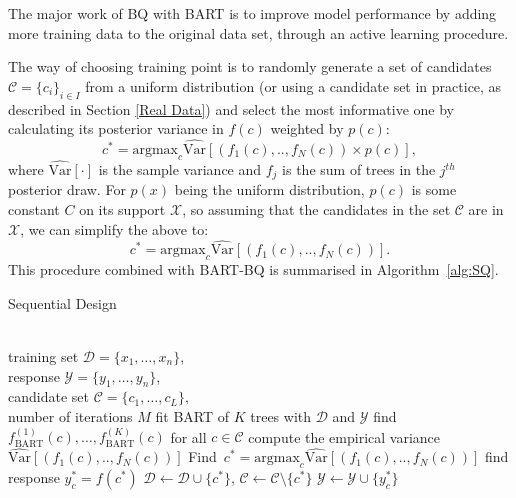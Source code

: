 The major work of BQ with BART is to improve model performance by adding more training data to the original data set, through an active learning procedure.

The way of choosing training point is to randomly generate a set of candidates $ \mathcal{C} = \{ c_i\}_{i\in I}$ from a uniform distribution (or using a candidate set in practice, as described in Section \ref{Real Data}) and select the most informative one by calculating its posterior variance in $f(c)$ weighted by $p(c)$:
\begin{equation}
	c^* = \mbox{argmax}_c \widehat{\mbox{Var}}[(f_{1}(c),..,f_{N}(c))\times p(c)],
	\label{eq:maxvariance}
\end{equation}
where $\widehat{\mbox{Var}}[\cdot]$ is the sample variance and $f_j$ is the sum of trees in the $j^{th}$ posterior draw. For $p(x)$ being the uniform distribution, $p(c)$ is some constant $C$ on its support $\mathcal{X}$, so assuming that the candidates in the set $\mathcal{C}$ are in $\mathcal{X}$, we can simplify the above to:
\begin{equation}
	c^* = \mbox{argmax}_c \widehat{\mbox{Var}}[(f_{1}(c),..,f_{N}(c))].
	\label{eq:maxvar}
\end{equation}
This procedure combined with BART-BQ is summarised in Algorithm~\ref{alg:SQ}.

\begin{algorithm}[tbh!]
  \caption{Sequential Design}
  \label{alg:SQ}
\begin{algorithmic}
  \\training set $\mathcal{D} = \{x_1, \ldots, x_n\}$, \\response $\mathcal{Y} = \{y_1, \ldots, y_n\}$, \\candidate set $\mathcal{C} = \{c_1, \ldots, c_L\},$ 
  \\
  number of iterations $M$
  \STATE fit BART of $K$ trees with $\mathcal{D}$ and $\mathcal{Y}$
  \STATE find $f_{\mbox{BART}}^{(1)}(c), \ldots, f_{\mbox{BART}}^{(K)}(c)$ for all $c\in\mathcal{C}$
  \STATE compute the empirical variance $ \widehat{\mbox{Var}}[(f_{1}(c),..,f_{N}(c))]$
  \STATE Find $\,c^* = \mbox{argmax}_{c} \widehat{\mbox{Var}}[(f_{1}(c),..,f_{N}(c))]
	\label{eq:maxvar}$
  \STATE find response $y_c^* = f(c^*)$
  \STATE $\mathcal{D} \leftarrow \mathcal{D}\cup \{c^*\}$, $\mathcal{C} \leftarrow \mathcal{C}\setminus \{c^*\}$
  \STATE $\mathcal{Y} \leftarrow \mathcal{Y}\cup \{y_c^*\}$
  \ENDFOR
\end{algorithmic}
\end{algorithm}


